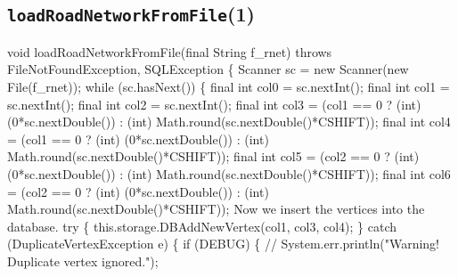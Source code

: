 \subsection{{\tt{}\protect{}loadRoadNetworkFromFile}(1)}
\nwenddocs{}\endmoddef{}
void loadRoadNetworkFromFile(final String f_rnet) throws FileNotFoundException, SQLException \{
  Scanner sc = new Scanner(new File(f_rnet));
  while (sc.hasNext()) \{
\eatline
{}\nwendcode{}
\nwenddocs{}\plusendmoddef
final int col0 = sc.nextInt();
final int col1 = sc.nextInt();
final int col2 = sc.nextInt();
final int col3 = (col1 == 0 ? (int) (0*sc.nextDouble()) : (int) Math.round(sc.nextDouble()*CSHIFT));
final int col4 = (col1 == 0 ? (int) (0*sc.nextDouble()) : (int) Math.round(sc.nextDouble()*CSHIFT));
final int col5 = (col2 == 0 ? (int) (0*sc.nextDouble()) : (int) Math.round(sc.nextDouble()*CSHIFT));
final int col6 = (col2 == 0 ? (int) (0*sc.nextDouble()) : (int) Math.round(sc.nextDouble()*CSHIFT));
\nwendcode{}\nwdocspar
{\small Now we insert the vertices into the database.}
\nwenddocs{}\plusendmoddef
try \{
  this.storage.DBAddNewVertex(col1, col3, col4);
\} catch (DuplicateVertexException e) \{
  if (DEBUG) \{
    // System.err.println("Warning! Duplicate vertex ignored.");
